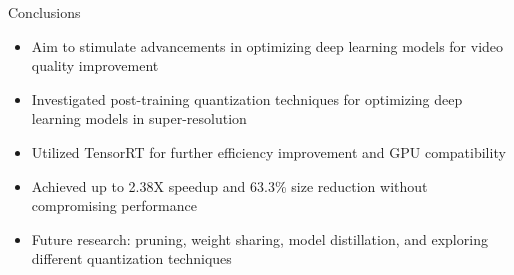 \documentclass{beamer}
\begin{document}


\begin{frame}{Conclusions}
\begin{itemize}
  \item Aim to stimulate advancements in optimizing deep learning models for video quality improvement
  \item Investigated post-training quantization techniques for optimizing deep learning models in super-resolution
  \item Utilized TensorRT for further efficiency improvement and GPU compatibility
  \item Achieved up to 2.38X speedup and 63.3\% size reduction without compromising performance
  \item Future research: pruning, weight sharing, model distillation, and exploring different quantization techniques
\end{itemize}
\end{frame}
\end{document}
